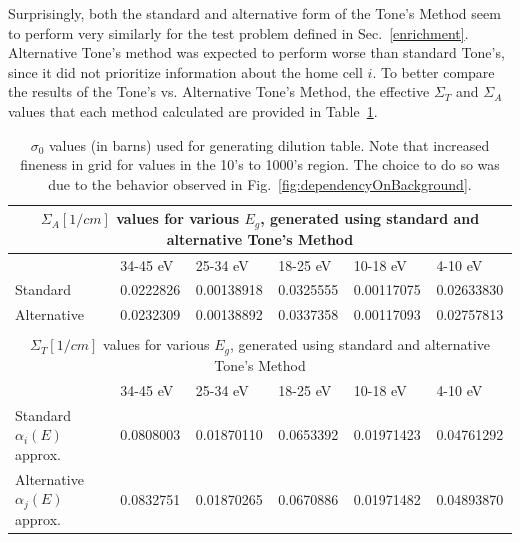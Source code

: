 \documentclass[10pt]{article}
\begin{document}
Surprisingly, both the standard and alternative form of the Tone's Method seem to perform very similarly for the test problem defined in Sec.~\ref{enrichment}. Alternative Tone's method was expected to perform worse than standard Tone's, since it did not prioritize information about the home cell $i$. To better compare the results of the Tone's vs. Alternative Tone's Method, the effective $\Sigma_T$ and $\Sigma_A$ values that each method calculated are provided in Table~\ref{table:one}.

\begin{table}[H]
  \begin{center}
\begin{tabular}{|l|l|l|l|l|l|}\hline
  \multicolumn{6}{|c|}{$\Sigma_A [1/cm]$ values for various $E_g$, generated using standard and alternative Tone's Method} \\\hline
           &34-45 eV& 25-34 eV   & 18-25 eV   & 10-18 eV & 4-10 eV \\\hline
  Standard   & 0.0222826 & 0.00138918 & 0.0325555 & 0.00117075 & 0.02633830 \\\hline
  Alternative& 0.0232309 & 0.00138892 & 0.0337358 & 0.00117093 & 0.02757813\\\hline&&&&&\\[1pt]\hline
  \multicolumn{6}{|c|}{$\Sigma_T [1/cm]$ values for various $E_g$, generated using standard and alternative Tone's Method} \\\hline
           &34-45 eV& 25-34 eV   & 18-25 eV   & 10-18 eV & 4-10 eV \\\hline
  Standard $\alpha_i(E)$ approx.  & 0.0808003 & 0.01870110& 0.0653392& 0.01971423 &  0.04761292\\\hline
  Alternative $\alpha_j(E)$ approx.& 0.0832751& 0.01870265& 0.0670886& 0.01971482&0.04893870\\\hline


\end{tabular}
    \caption{$\sigma_0$ values (in barns) used for generating dilution table. Note that increased fineness in grid for values in the 10's to 1000's region. The choice to do so was due to the behavior observed in Fig.~\ref{fig:dependencyOnBackground}.}
    \label{table:one}
  \end{center}
\end{table}
\end{document}
